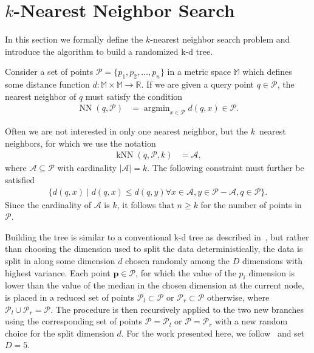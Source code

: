 \section{$k$-Nearest Neighbor Search}
  \label{sec:background}

  In this section we formally define the $k$-nearest neighbor search problem 
  and introduce the algorithm to build a randomized k-d tree.

   Consider a set of points $\mathcal{P} 
  = \{p_1,p_2,\dots,p_n\}$ in a metric space $\mathbb{M}$ which defines some 
  distance function $d\colon\mathbb{M}\times\mathbb{M}\to\mathbb{R}$.  If we 
  are given a query point $q\in\mathcal{P}$, the nearest neighbor of $q$ must 
  satisfy the condition
  \begin{align}
    \label{eq:NN}
    \operatorname{NN}(q,\mathcal{P}) &= \operatorname{argmin}_{x\in\mathcal{P}} 
    d(q,x)\in\mathcal{P}.
  \end{align}

  Often we are not interested in only one nearest neighbor, but the $k$~nearest 
  neighbors, for which we use the notation
  \begin{align}
    \label{eq:kNN}
    \operatorname{kNN}(q,\mathcal{P},k) &= \mathcal{A},
  \end{align}
  where $\mathcal{A}\subseteq\mathcal{P}$ with cardinality 
  $\vert\mathcal{A}\vert = k$.  The following constraint must further be 
  satisfied
  \begin{align}
    \label{eq:constraint_kNN}
    \{d(q,x)\mid d(q,x)\leq d(q,y)\forall x\in\mathcal{A}, 
    y\in\mathcal{P}-\mathcal{A},q\in\mathcal{P}\}.
  \end{align}
  Since the cardinality of $\mathcal{A}$ is $k$, it follows that $n\geq k$ for 
  the number of points in $\mathcal{P}$.

   Building the tree is similar to a conventional 
  k-d tree as described in~\cite{bentley1975a,friedman1977a}, but rather than choosing the dimension used to split the data deterministically, 
  the data is split %
  in along some dimension $d$ chosen randomly among the $D$ dimensions with highest variance. Each point 
  $\pmb{p}\in\mathcal{P}$, for which the value of the $p_i$ dimension is lower than 
  the value of the median in the chosen dimension at the current node, is 
  placed in a reduced set of points $\mathcal{P}_l\subset\mathcal{P}$ or 
  $\mathcal{P}_r\subset\mathcal{P}$ otherwise, where 
  $\mathcal{P}_l\cup\mathcal{P}_r = \mathcal{P}$.
  The procedure is then recursively applied to the two new branches using the 
  corresponding set of points $\mathcal{P}=\mathcal{P}_l$ or 
  $\mathcal{P}=\mathcal{P}_r$ with a new random choice for the split dimension 
  $d$. %
  For the work presented here, we follow~\cite{muja2009a} and set 
  $D=5$.
  
